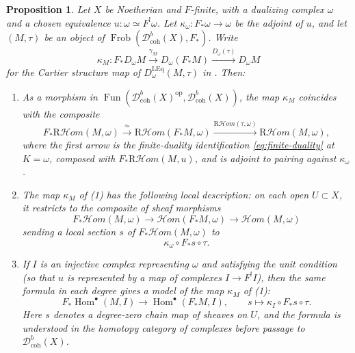 \documentclass[11pt]{amsart}
\newcommand{\Hom}{\operatorname{Hom}}
\newcommand{\op}{{\operatorname{op}}}
\DeclareMathOperator{\Fun}{\mathrm{Fun}}
\newcommand{\shHom}{\mathcal Hom}
\newcommand{\RHom}{\mathrm R\mathcal Hom}
\newcommand{\Frob}{\operatorname{Frob}}
\newcommand{\Dbc}{\mathcal D^b_{\mathrm{coh}}}
\theoremstyle{plain}
\newtheorem{proposition}[proposition]{Proposition}
\theoremstyle{definition}
\numberwithin{equation}{section}
\begin{document}
\begin{proposition}\label{prop:trace-formula}
Let $X$ be Noetherian and $F$-finite, with a dualizing complex $\omega$ and a chosen equivalence $u:\omega\simeq F^!\omega$.
Let $\kappa_\omega:F_*\omega\to\omega$ be the adjoint of $u$, and let $(M,\tau)$ be an object of $\Frob(\Dbc(X),F_*)$.
Write
\[
 \kappa_M:
 F_*D_\omega M
 \xrightarrow{\gamma_M}
 D_\omega(F_*M)
 \xrightarrow{D_\omega(\tau)}
 D_\omega M
\]
for the Cartier structure map of $D_\omega^{\mathrm{LEq}}(M,\tau)$ in .
Then:
\begin{enumerate}
\item
As a morphism in $\Fun(\Dbc(X)^{\op},\Dbc(X))$, the map $\kappa_M$ coincides with the composite
\[
 F_*\RHom(M,\omega)
 \xrightarrow{\ \simeq\ }
 \RHom(F_*M,\omega)
 \xrightarrow{\RHom(\tau,\omega)}
 \RHom(M,\omega),
\]
where the first arrow is the finite-duality identification \eqref{eq:finite-duality} at $K=\omega$, composed with $F_*\RHom(M,u)$, and is adjoint to pairing against $\kappa_\omega$.
\item
The map $\kappa_M$ of \textup{(1)} has the following local description: on each open $U\subset X$, it restricts to the composite of sheaf morphisms
\[
 F_*\shHom(M,\omega)\longrightarrow\shHom(F_*M,\omega)\longrightarrow\shHom(M,\omega)
\]
sending a local section $s$ of $F_*\shHom(M,\omega)$ to
\begin{equation}\label{eq:trace-formula}
 \kappa_\omega\circ F_*s\circ\tau.
\end{equation}
\item
If $I$ is an injective complex representing $\omega$ and satisfying the unit condition (so that $u$ is represented by a map of complexes $I\to F^!I$), then the same formula in each degree gives a model of the map $\kappa_M$ of \textup{(1)}:
\begin{equation}\label{eq:trace-formula-complex}
 F_*\Hom^\bullet(M,I)\longrightarrow\Hom^\bullet(F_*M,I),\qquad
 s\longmapsto\kappa_I\circ F_*s\circ\tau.
\end{equation}
Here $s$ denotes a degree-zero chain map of sheaves on $U$, and the formula is understood in the homotopy category of complexes before passage to $\Dbc(X)$.
\end{enumerate}
\end{proposition}
\end{document}
